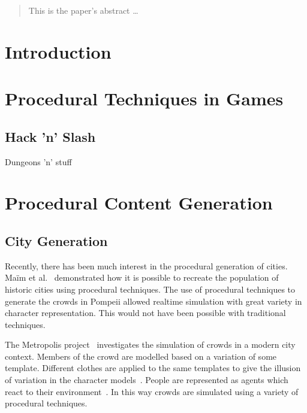 \documentclass[12pt]{article}
\begin{document}
\maketitle

\clearpage

\begin{abstract}
This is the paper's abstract \ldots
\end{abstract}

\clearpage

\section{Introduction}

\section{Procedural Techniques in Games}

\subsection{Hack 'n' Slash}
Dungeons 'n' stuff

\section{Procedural Content Generation}

\subsection{City Generation}
Recently, there has been much interest in the procedural generation of cities.
Ma\"{i}m et al.~\cite{maim2007populating} demonstrated how it is possible to recreate the population of historic cities using procedural techniques.
The use of procedural techniques to generate the crowds in Pompeii allowed realtime simulation with great variety in character representation.
This would not have been possible with traditional techniques.

The Metropolis project~\cite{web:metropolis} investigates the simulation of crowds in a modern city context.
Members of the crowd are modelled based on a variation of some template.
Different clothes are applied to the same templates to give the illusion of variation in the character models~\cite{mcdonnell2007pipeline}.
People are represented as agents which react to their environment~\cite{ulicny2002towards}.
In this way crowds are simulated using a variety of procedural techniques.
\end{document}
